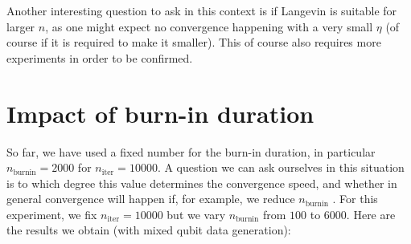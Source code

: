 \documentclass[12pt]{memoir}
\newcommand{\nitern}[1]{$n_{\text{iter}}=#1$}
\newcommand{\nburninn}[1]{$n_{\text{burnin}}=#1$}
\newcommand{\nburnin}[0]{$n_{\text{burnin}} $ }
\begin{document}
Another interesting question to ask in this context is if Langevin is suitable for larger $n$, as one might expect no convergence happening with a very small $\eta$ (of course if it is required to make it smaller). This of course also requires more experiments in order to be confirmed.

\section{Impact of burn-in duration}\label{section:comp-burnin}
So far, we have used a fixed number for the burn-in duration, in particular \nburninn{2000} for \nitern{10000}. A question we can ask ourselves in this situation is to which degree this value determines the convergence speed, and whether in general convergence will happen if, for example, we reduce \nburnin. For this experiment, we fix \nitern{10000} but we vary \nburnin from $100$ to $6000$. Here are the results we obtain (with mixed qubit data generation):
\end{document}
